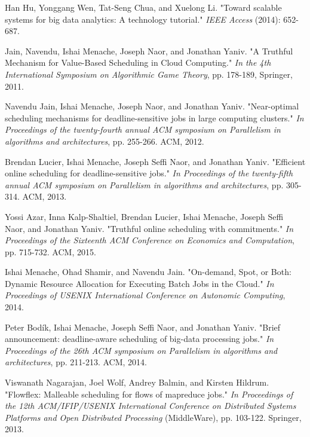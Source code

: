 \documentclass[10pt,journal,compsoc]{IEEEtran}
\begin{document}
\begin{thebibliography}{1}






Han Hu, Yonggang Wen, Tat-Seng Chua, and Xuelong Li. "Toward scalable systems for big data analytics: A technology tutorial." {\em IEEE Access} (2014): 652-687.



Jain, Navendu, Ishai Menache, Joseph Naor, and Jonathan Yaniv. "A Truthful Mechanism for Value-Based Scheduling in Cloud Computing." {\em In the 4th International Symposium on Algorithmic Game Theory}, pp. 178-189, Springer, 2011.


Navendu Jain, Ishai Menache, Joseph Naor, and Jonathan Yaniv. "Near-optimal scheduling mechanisms for deadline-sensitive jobs in large computing clusters." {\em In Proceedings of the twenty-fourth annual ACM symposium on Parallelism in algorithms and architectures}, pp. 255-266. ACM, 2012.



Brendan Lucier, Ishai Menache, Joseph Seffi Naor, and Jonathan Yaniv. "Efficient online scheduling for deadline-sensitive jobs." {\em In Proceedings of the twenty-fifth annual ACM symposium on Parallelism in algorithms and architectures}, pp. 305-314. ACM, 2013.


Yossi Azar, Inna Kalp-Shaltiel, Brendan Lucier, Ishai Menache, Joseph Seffi Naor, and Jonathan Yaniv. "Truthful online scheduling with commitments." {\em In Proceedings of the Sixteenth ACM Conference on Economics and Computation}, pp. 715-732. ACM, 2015.



Ishai Menache, Ohad Shamir, and Navendu Jain. "On-demand, Spot, or Both: Dynamic Resource Allocation for Executing Batch Jobs in the Cloud." {\em In Proceedings of USENIX International Conference on Autonomic Computing}, 2014.




Peter Bod\'ik, Ishai Menache, Joseph Seffi Naor, and Jonathan Yaniv. "Brief announcement: deadline-aware scheduling of big-data processing jobs." {\em In Proceedings of the 26th ACM symposium on Parallelism in algorithms and architectures}, pp. 211-213. ACM, 2014.



Viswanath Nagarajan, Joel Wolf, Andrey Balmin, and Kirsten Hildrum. "Flowflex: Malleable scheduling for flows of mapreduce jobs." {\em In Proceedings of the 12th ACM/IFIP/USENIX International Conference on Distributed Systems Platforms and Open Distributed Processing} (MiddleWare), pp. 103-122. Springer, 2013.




\end{thebibliography}
\end{document}
